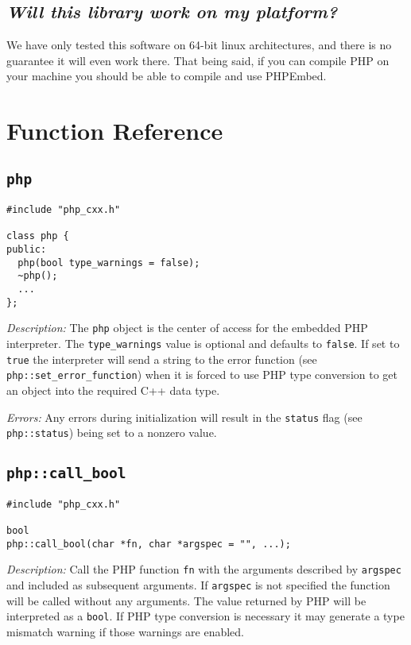 \documentclass[11pt,titlepage]{article}
\begin{document}
\subsection{\emph{Will this library work on my platform?}}
We have only tested this software on 64-bit linux architectures, and there is no guarantee it will even work there. That being said, if you can compile PHP on your machine you should be able to compile and use PHPEmbed.



\section{Function Reference}


\subsection{\texttt{php}}

\begin{verbatim}
#include "php_cxx.h"

class php {
public:
  php(bool type_warnings = false);
  ~php();
  ...
};
\end{verbatim}

\emph{Description:} The \verb|php| object is the center of access for the embedded PHP interpreter. The \verb|type_warnings| value is optional and defaults to \verb|false|. If set to \verb|true| the interpreter will send a string to the error function (see \verb|php::set_error_function|) when it is forced to use PHP type conversion to get an object into the required C++ data type.

\emph{Errors:} Any errors during initialization will result in the \verb|status| flag (see \verb|php::status|) being set to a nonzero value.


\subsection{\texttt{php::call\_bool}}

\begin{verbatim}
#include "php_cxx.h"

bool 
php::call_bool(char *fn, char *argspec = "", ...);
\end{verbatim}

\emph{Description:} Call the PHP function \verb|fn| with the arguments described by \verb|argspec| and included as subsequent arguments. If \verb|argspec| is not specified the function will be called without any arguments. The value returned by PHP will be interpreted as a \verb|bool|. If PHP type conversion is necessary it may generate a type mismatch warning if those warnings are enabled.
\end{document}
